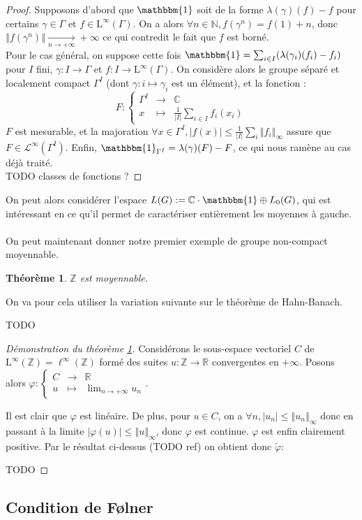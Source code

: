 \documentclass[a4paper,12pt]{article}
\newtheorem{theorem}{Théorème}[section]
\newcommand{\R}{\mathbb{R}}
\newcommand{\N}{\mathbb{N}}
\newcommand{\Z}{\mathbb{Z}}
\newcommand{\C}{\mathbb{C}}
\newcommand{\norm}[1]{\left\Vert #1\right\Vert}
\newcommand{\abs}[1]{\left\vert#1\right\vert}
\newcommand{\card}[1]{\abs{#1}}
\newcommand{\indic}{\mathbbm{1}}
\newcommand\fundef[3]{#1: \left\{\begin{array}{ccc}#2\\#3\end{array}\right.}
\begin{document}
\begin{proof}
    Supposons d'abord que $\indic$ soit de la forme $\lambda(\gamma)(f) - f$ pour certains $\gamma\in\Gamma$ et 
    $f\in\mathrm{L}^\infty(\Gamma)$. On a alors $\forall n\in\N, f(\gamma^n) = f(1) + n$, donc $\norm{f(\gamma^n)}\xrightarrow[n\to+\infty]{}+\infty$
    ce qui contredit le fait que $f$ est borné. \\
    Pour le cas général, on suppose cette fois $\indic = \sum_{i\in I} (\lambda(\gamma_i)(f_i) - f_i)$ pour $I$ fini, $\gamma : I \to\Gamma$ et
    $f : I\to\mathrm{L}^\infty(\Gamma)$. On considère alors le groupe séparé et localement compact $\Gamma^I$ (dont $\gamma : i\mapsto \gamma_i$ est
    un élément), et la fonction : 
    \begin{equation*}
        \fundef{F}{\Gamma^I&\to&\C}{x&\mapsto&\frac{1}{\card{I}}\sum_{i\in I}f_i(x_i)}
    \end{equation*}
    $F$ est mesurable, et la majoration
    $\forall x\in\Gamma^I, \abs{f(x)}\le\frac1{\card{I}}\sum_i\norm{f_i}_\infty$ assure que $F\in\mathscr{L}^\infty(\Gamma^I)$. 
    Enfin, $\indic_{\Gamma^I} = \lambda(\gamma)(F) - F$, ce qui nous ramène au cas déjà traité. \\
    TODO classes de fonctions ?
\end{proof}

On peut alors considérer l'espace $L(G) := \C\cdot\indic \oplus L_0(G)$, qui est intéressant en ce qu'il permet de caractériser entièrement
les moyennes à gauche.

\paragraph{}


On peut maintenant donner notre premier exemple de groupe non-compact moyennable.

\begin{theorem}\label{Z_amenable}
    $\Z$ est moyennable.
\end{theorem}

On va pour cela utiliser la variation suivante sur le théorème de Hahn-Banach.

TODO

\begin{proof}[Démonstration du théorème \ref{Z_amenable}]
    Considérons le sous-espace vectoriel $C$ de $\mathrm{L}^\infty(\Z) = \ell^\infty(\Z)$ formé 
    des suites $u:\Z\to\R$ convergentes en $+\infty$. Posons alors 
    $\fundef{\varphi}{C&\to&\R}{u&\mapsto&\lim_{n\to+\infty}u_n}$.

    Il est clair que $\varphi$ est linéaire. De plus, pour $u\in C$, on a $\forall n, \abs{u_n}\le\norm{u_n}_\infty$
    donc en passant à la limite $\abs{\varphi(u)}\le\norm{u}_\infty$, donc $\varphi$ est continue. $\varphi$ est enfin clairement positive.
    Par le résultat ci-dessus (TODO ref) on obtient donc $\widetilde{\varphi}:$

    TODO
\end{proof}

\subsection{Condition de F\o{}lner}
\end{document}
